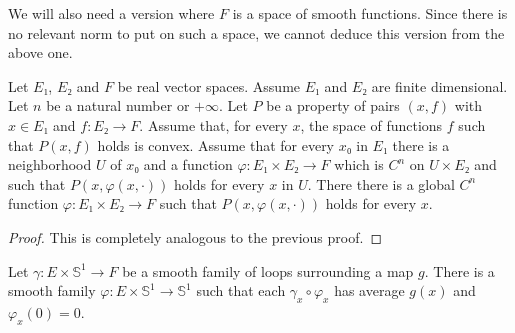 \documentclass[10pt,a4paper]{article}
\newcommand{\co}{\!:}
\newcommand{\C}{C} %
\newcommand{\uses}[1]{}
\newcommand{\lean}[1]{}
\newcommand{\leanok}{}
\begin{document}
We will also need a version where $F$ is a space of smooth functions. Since
there is no relevant norm to put on such a space, we cannot deduce this version
from the above one.

\begin{lemma}
  \label{lem:exists_cont_diff_of_convex₂}
  \lean{exists_contDiff_of_convex₂}
  \leanok
  Let $E₁$, $E₂$ and $F$ be real vector spaces. Assume $E₁$ and $E₂$ are finite dimensional.
  Let $n$ be a natural number or $+\infty$. Let $P$ be a property
  of pairs $(x, f)$ with $x ∈ E₁$ and $f : E₂ → F$. Assume that, for every $x$, the space
  of functions $f$ such that $P(x, f)$ holds is convex. Assume that for every $x₀$
  in $E₁$ there is a neighborhood $U$ of $x₀$ and a function $φ : E₁ × E₂ → F$ which is
  $\C^n$ on $U × E₂$ and such that $P(x, φ(x, \cdot))$ holds for every $x$ in $U$.
  There there is a global $\C^n$ function $φ \co E₁ × E₂ → F$ such that
  $P(x, φ(x, \cdot))$ holds for every $x$.
\end{lemma}

\begin{proof}
  \leanok
  This is completely analogous to the previous proof.
\end{proof}

\begin{lemma}
\label{lem:reparametrization}
\uses{def:surrounds}
\lean{SmoothSurroundingFamily.reparametrize_average}
\leanok
Let $γ \co E × 𝕊^1 → F$ be a smooth family of loops surrounding
a map $g$.
There is a smooth family $φ \co E × 𝕊^1 → 𝕊^1$ such
that each $γ_x ∘ φ_x$ has average $g(x)$ and $φ_x(0) = 0$.
\end{lemma}
\end{document}
